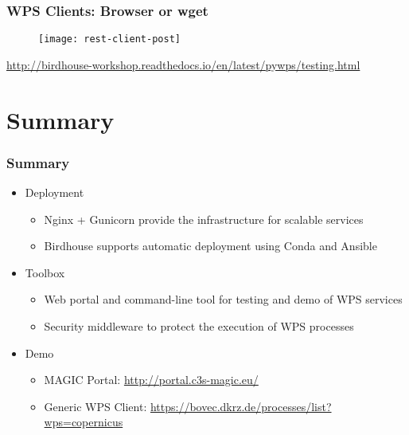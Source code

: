 \documentclass{beamer}
\begin{document}
\begin{frame}
\frametitle<presentation>{WPS Clients: Browser or wget}

  \begin{figure}[ht]
    \centering
    \texttt{[image: rest-client-post]}
  \end{figure}

  \centering
  \footnotesize{\url{http://birdhouse-workshop.readthedocs.io/en/latest/pywps/testing.html}}

\end{frame}

\section{Summary}

\begin{frame}
\frametitle<presentation>{Summary}

\begin{itemize}

  \item Deployment
  \begin{itemize}
    \item Nginx + Gunicorn provide the infrastructure for scalable services
    \item Birdhouse supports automatic deployment using Conda and Ansible
  \end{itemize}

  \item{Toolbox}
  \begin{itemize}
    \item Web portal and command-line tool for testing and demo of WPS services
    \item Security middleware to protect the execution of WPS processes
  \end{itemize}

  \item{Demo}
  \begin{itemize}
    \item MAGIC Portal: \url{http://portal.c3s-magic.eu/}
    \item Generic WPS Client: \url{https://bovec.dkrz.de/processes/list?wps=copernicus}
  \end{itemize}
\end{itemize}

\end{frame}
\end{document}
